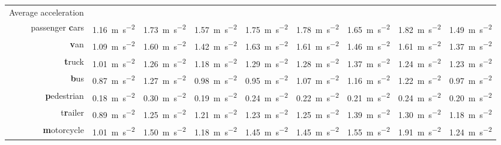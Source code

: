 \documentclass[a4paper, 10pt, conference]{ieeeconf}      %
\begin{document}
\begin{table}[t]
\begin{center}
\begin{tabular}{r|r|r|r|r|r|r|r||r}
    \multicolumn{1}{l|}{Average acceleration} & & & & & & & & \\
    passenger \textbf{c}ars & \SI{1,16}{\meter\per\square\second} & \SI{1,73}{\meter\per\square\second} & \SI{1,57}{\meter\per\square\second} & \SI{1,75}{\meter\per\square\second} & \SI{1,78}{\meter\per\square\second} & \SI{1,65}{\meter\per\square\second} & \SI{1,82}{\meter\per\square\second} & \SI{1,49}{\meter\per\square\second} \\
                \textbf{v}an & \SI{1,09}{\meter\per\square\second} & \SI{1,60}{\meter\per\square\second} & \SI{1,42}{\meter\per\square\second} & \SI{1,63}{\meter\per\square\second} & \SI{1,61}{\meter\per\square\second} & \SI{1,46}{\meter\per\square\second} & \SI{1,61}{\meter\per\square\second} & \SI{1,37}{\meter\per\square\second} \\
            \textbf{t}ruck & \SI{1,01}{\meter\per\square\second} & \SI{1,26}{\meter\per\square\second} & \SI{1,18}{\meter\per\square\second} & \SI{1,29}{\meter\per\square\second} & \SI{1,28}{\meter\per\square\second} & \SI{1,37}{\meter\per\square\second} & \SI{1,24}{\meter\per\square\second} & \SI{1,23}{\meter\per\square\second} \\
            \textbf{b}us & \SI{0,87}{\meter\per\square\second} & \SI{1,27}{\meter\per\square\second} & \SI{0,98}{\meter\per\square\second} & \SI{0,95}{\meter\per\square\second} & \SI{1,07}{\meter\per\square\second} & \SI{1,16}{\meter\per\square\second} & \SI{1,22}{\meter\per\square\second} & \SI{0,97}{\meter\per\square\second} \\
        \textbf{p}edestrian & \SI{0,18}{\meter\per\square\second} & \SI{0,30}{\meter\per\square\second} & \SI{0,19}{\meter\per\square\second} & \SI{0,24}{\meter\per\square\second} & \SI{0,22}{\meter\per\square\second} & \SI{0,21}{\meter\per\square\second} & \SI{0,24}{\meter\per\square\second} & \SI{0,20}{\meter\per\square\second} \\
        t\textbf{r}ailer & \SI{0,89}{\meter\per\square\second} & \SI{1,25}{\meter\per\square\second} & \SI{1,21}{\meter\per\square\second} & \SI{1,23}{\meter\per\square\second} & \SI{1,25}{\meter\per\square\second} & \SI{1,39}{\meter\per\square\second} & \SI{1,30}{\meter\per\square\second} & \SI{1,18}{\meter\per\square\second} \\
        \textbf{m}otorcycle & \SI{1,01}{\meter\per\square\second} & \SI{1,50}{\meter\per\square\second} & \SI{1,18}{\meter\per\square\second} & \SI{1,45}{\meter\per\square\second} & \SI{1,45}{\meter\per\square\second} & \SI{1,55}{\meter\per\square\second} & \SI{1,91}{\meter\per\square\second} & \SI{1,24}{\meter\per\square\second} \\

\end{tabular}
\end{center}
\end{table}
\end{document}
